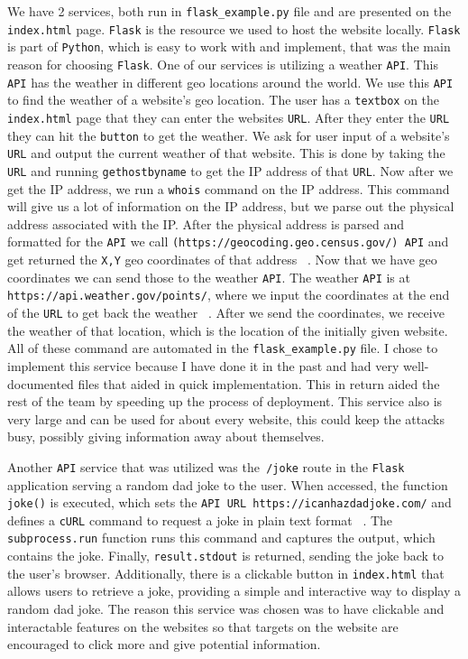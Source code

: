 We have 2 services, both run in \verb+flask_example.py+ file and are presented on the \verb+index.html+ page. \verb+Flask+ is the resource we used to host the website locally. \verb+Flask+ is part of \verb+Python+, which is easy to work with and implement, that was the main reason for choosing \verb+Flask+.
One of our services is utilizing a weather \verb+API+. This \verb+API+ has the weather in different geo locations around the world. We use this \verb+API+ to find the weather of a website’s geo location. The user has a \verb+textbox+ on the \verb+index.html+ page that they can enter the websites \verb+URL+. After they enter the \verb+URL+ they can hit the \verb+button+ to get the weather. We ask for user input of a website's \verb+URL+ and output the current weather of that website. This is done by taking the \verb+URL+ and running \verb+gethostbyname+ to get the IP address of that \verb+URL+. Now after we get the IP address, we run a \verb+whois+ command on the IP address. This command will give us a lot of information on the IP address, but we parse out the physical address associated with the IP. After the physical address is parsed and formatted for the \verb+API+ we call \verb+(https://geocoding.geo.census.gov/) API+ and get returned the \verb+X,Y+ geo coordinates of that address ~\cite{GeoLocationAPI}. Now that we have geo coordinates we can send those to the weather \verb+API+. The weather \verb+API+ is at \verb+https://api.weather.gov/points/+, where we input the coordinates at the end of the \verb+URL+ to get back the weather ~\cite{WeahterAPI}. After we send the coordinates, we receive the weather of that location, which is the location of the initially given website. All of these command are automated in the \verb+flask_example.py+ file. I chose to implement this service because I have done it in the past and had very well-documented files that aided in quick implementation. This in return aided the rest of the team by speeding up the process of deployment. This service also is very large and can be used for about every website, this could keep the attacks busy, possibly giving information away about themselves.

Another \verb+API+ service that was utilized was the\verb+ /joke+ route in the \verb+Flask+ application serving a random dad joke to the user. When accessed, the function \verb+joke()+ is executed, which sets the \verb+API URL https://icanhazdadjoke.com/+ and defines a \verb+cURL+ command to request a joke in plain text format ~\cite{DadJokesAPI}. The \verb+subprocess.run+ function runs this command and captures the output, which contains the joke. Finally,  \verb+result.stdout+ is returned, sending the joke back to the user's browser. Additionally, there is a clickable button in \verb+index.html+ that allows users to retrieve a joke, providing a simple and interactive way to display a random dad joke. The reason this service was chosen was to have clickable and interactable features on the websites so that targets on the website are encouraged to click more and give potential information.

